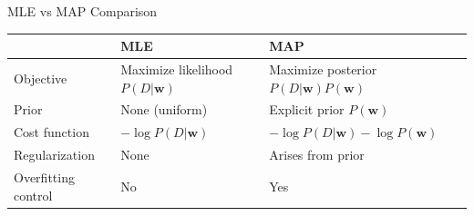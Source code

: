 \documentclass[serif, aspectratio=169]{beamer}
\begin{document}
\begin{frame}{MLE vs MAP Comparison}
    \centering
    \small
    \renewcommand{\arraystretch}{1.5} %
    \begin{tabular}{|p{3cm}|p{5cm}|p{5cm}|}
        \hline
         & \textbf{MLE} & \textbf{MAP} \\ \hline
        Objective & Maximize likelihood $P(D|\mathbf{w})$ & Maximize posterior $P(D|\mathbf{w})P(\mathbf{w})$ \\ \hline
        Prior & None (uniform) & Explicit prior $P(\mathbf{w})$ \\ \hline
        Cost function & $-\log P(D|\mathbf{w})$ & $-\log P(D|\mathbf{w}) - \log P(\mathbf{w})$ \\ \hline
        Regularization & None & Arises from prior \\ \hline
        Overfitting control & No & Yes \\ \hline
    \end{tabular}
\end{frame}



\end{document}
